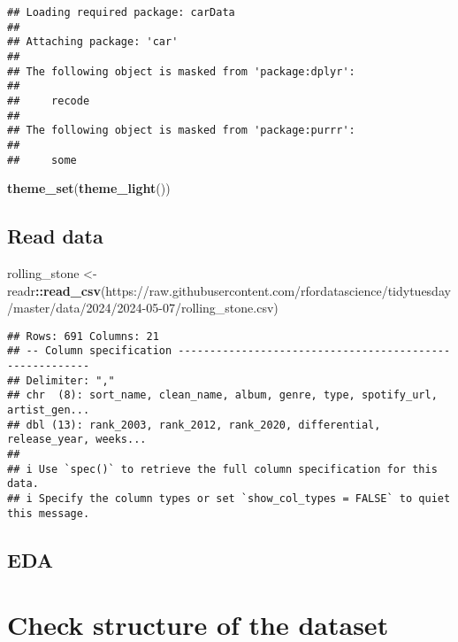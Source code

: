 \documentclass[
]{article}
\newenvironment{Shaded}{\begin{snugshade}}{\end{snugshade}}
\newcommand{\FunctionTok}[1]{\textcolor[rgb]{0.13,0.29,0.53}{\textbf{#1}}}
\newcommand{\NormalTok}[1]{#1}
\newcommand{\OtherTok}[1]{\textcolor[rgb]{0.56,0.35,0.01}{#1}}
\newcommand{\SpecialCharTok}[1]{\textcolor[rgb]{0.81,0.36,0.00}{\textbf{#1}}}
\newcommand{\StringTok}[1]{\textcolor[rgb]{0.31,0.60,0.02}{#1}}
\begin{document}
\begin{verbatim}
## Loading required package: carData
## 
## Attaching package: 'car'
## 
## The following object is masked from 'package:dplyr':
## 
##     recode
## 
## The following object is masked from 'package:purrr':
## 
##     some
\end{verbatim}

\begin{Shaded}
\begin{Highlighting}[]
\FunctionTok{theme\_set}\NormalTok{(}\FunctionTok{theme\_light}\NormalTok{())}
\end{Highlighting}
\end{Shaded}

\subsection{Read data}\label{read-data}

\begin{Shaded}
\begin{Highlighting}[]
\NormalTok{rolling\_stone }\OtherTok{\textless{}{-}}\NormalTok{ readr}\SpecialCharTok{::}\FunctionTok{read\_csv}\NormalTok{(}\StringTok{\textquotesingle{}https://raw.githubusercontent.com/rfordatascience/tidytuesday/master/data/2024/2024{-}05{-}07/rolling\_stone.csv\textquotesingle{}}\NormalTok{)}
\end{Highlighting}
\end{Shaded}

\begin{verbatim}
## Rows: 691 Columns: 21
## -- Column specification --------------------------------------------------------
## Delimiter: ","
## chr  (8): sort_name, clean_name, album, genre, type, spotify_url, artist_gen...
## dbl (13): rank_2003, rank_2012, rank_2020, differential, release_year, weeks...
## 
## i Use `spec()` to retrieve the full column specification for this data.
## i Specify the column types or set `show_col_types = FALSE` to quiet this message.
\end{verbatim}

\subsection{EDA}\label{eda}

\section{Check structure of the
dataset}\label{check-structure-of-the-dataset}
\end{document}
